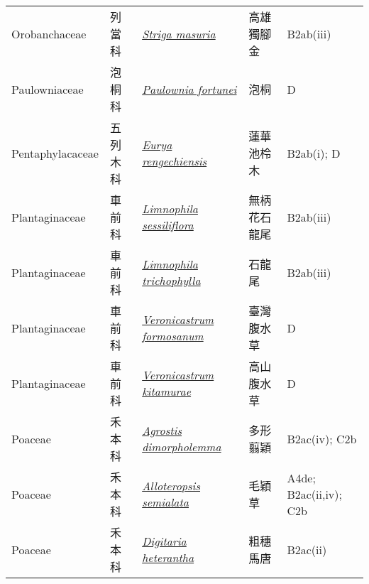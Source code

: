 {\begin{longtable}{p{2.5cm}p{2.5cm}p{4.5cm}p{2.5cm}p{3cm}}
    Orobanchaceae & 列當科 & \href{http://www.theplantlist.org/tpl1.1/search?q=Striga+masuria}{\textit{Striga masuria} } & 高雄獨腳金 & B2ab(iii) \index{Striga@\textit{Striga}!masuria@\textit{masuria}}  \index{高雄獨腳金} \\
    Paulowniaceae & 泡桐科 & \href{http://www.theplantlist.org/tpl1.1/search?q=Paulownia+fortunei}{\textit{Paulownia fortunei} } & 泡桐 & D \index{Paulownia@\textit{Paulownia}!fortunei@\textit{fortunei}}  \index{泡桐} \\
    Pentaphylacaceae & 五列木科 & \href{http://www.theplantlist.org/tpl1.1/search?q=Eurya+rengechiensis}{\textit{Eurya rengechiensis} } & 蓮華池柃木 & B2ab(i); D \index{Eurya@\textit{Eurya}!rengechiensis@\textit{rengechiensis}}  \index{蓮華池柃木} \\
    Plantaginaceae & 車前科 & \href{http://www.theplantlist.org/tpl1.1/search?q=Limnophila+sessiliflora}{\textit{Limnophila sessiliflora} } & 無柄花石龍尾 & B2ab(iii) \index{Limnophila@\textit{Limnophila}!sessiliflora@\textit{sessiliflora}}  \index{無柄花石龍尾} \\
    Plantaginaceae & 車前科 & \href{http://www.theplantlist.org/tpl1.1/search?q=Limnophila+trichophylla}{\textit{Limnophila trichophylla} } & 石龍尾 & B2ab(iii) \index{Limnophila@\textit{Limnophila}!trichophylla@\textit{trichophylla}}  \index{石龍尾} \\
    Plantaginaceae & 車前科 & \href{http://www.theplantlist.org/tpl1.1/search?q=Veronicastrum+formosanum}{\textit{Veronicastrum formosanum} } & 臺灣腹水草 & D \index{Veronicastrum@\textit{Veronicastrum}!formosanum@\textit{formosanum}}  \index{臺灣腹水草} \\
    Plantaginaceae & 車前科 & \href{http://www.theplantlist.org/tpl1.1/search?q=Veronicastrum+kitamurae}{\textit{Veronicastrum kitamurae} } & 高山腹水草 & D \index{Veronicastrum@\textit{Veronicastrum}!kitamurae@\textit{kitamurae}}  \index{高山腹水草} \\
    Poaceae & 禾本科 & \href{http://www.theplantlist.org/tpl1.1/search?q=Agrostis+dimorpholemma}{\textit{Agrostis dimorpholemma} } & 多形翦穎 & B2ac(iv); C2b \index{Agrostis@\textit{Agrostis}!dimorpholemma@\textit{dimorpholemma}}  \index{多形翦穎} \\
    Poaceae & 禾本科 & \href{http://www.theplantlist.org/tpl1.1/search?q=Alloteropsis+semialata}{\textit{Alloteropsis semialata} } & 毛穎草 & A4de; B2ac(ii,iv); C2b \index{Alloteropsis@\textit{Alloteropsis}!semialata@\textit{semialata}}  \index{毛穎草} \\
    Poaceae & 禾本科 & \href{http://www.theplantlist.org/tpl1.1/search?q=Digitaria+heterantha}{\textit{Digitaria heterantha} } & 粗穗馬唐 & B2ac(ii) \index{Digitaria@\textit{Digitaria}!heterantha@\textit{heterantha}}  \index{粗穗馬唐} \\

\end{longtable}}
